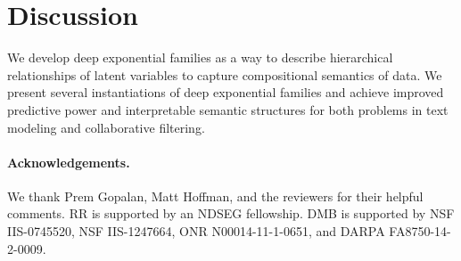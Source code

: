 \documentclass[twoside]{article}
\begin{document}
\section{Discussion}
We develop deep exponential families as a way to describe hierarchical relationships of
latent variables to capture compositional semantics of data. 
We present several instantiations of deep exponential families and achieve
improved predictive power and interpretable semantic structures for both problems in
text modeling and collaborative filtering.

\paragraph{Acknowledgements.}
We thank Prem Gopalan, Matt Hoffman, and the reviewers for their helpful comments.
RR is supported by an NDSEG fellowship. DMB is supported by NSF IIS-0745520,
NSF IIS-1247664, ONR N00014-11-1-0651, and DARPA FA8750-14-2-0009.

{\small

}
\end{document}
